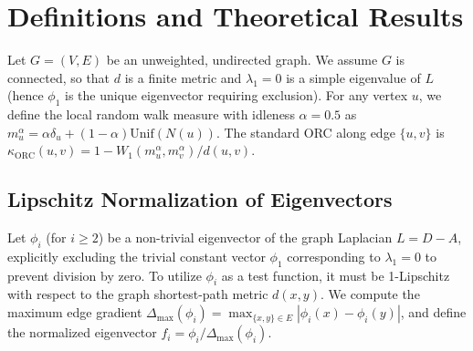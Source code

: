 \documentclass{article}
\begin{document}
\section{Definitions and Theoretical Results}

Let $G = (V, E)$ be an unweighted, undirected graph. We assume $G$ is connected, so that $d$ is a finite metric and $\lambda_1 = 0$ is a simple eigenvalue of $L$ (hence $\phi_1$ is the unique eigenvector requiring exclusion). For any vertex $u$, we define the local random walk measure with idleness $\alpha=0.5$ as $m_u^\alpha = \alpha\delta_u + (1-\alpha)\text{Unif}(N(u))$. The standard ORC along edge $\{u,v\}$ is $\kappa_{\text{ORC}}(u,v) = 1 - W_1(m_u^\alpha, m_v^\alpha)/d(u,v)$.

\subsection{Lipschitz Normalization of Eigenvectors}
Let $\phi_i$ (for $i \ge 2$) be a non-trivial eigenvector of the graph Laplacian $L=D-A$, explicitly excluding the trivial constant vector $\phi_1$ corresponding to $\lambda_1 = 0$ to prevent division by zero. To utilize $\phi_i$ as a test function, it must be 1-Lipschitz with respect to the graph shortest-path metric $d(x,y)$. We compute the maximum edge gradient $\Delta_{\max}(\phi_i) = \max_{\{x,y\} \in E} |\phi_i(x) - \phi_i(y)|$, and define the normalized eigenvector $f_i = \phi_i / \Delta_{\max}(\phi_i)$.
\end{document}
